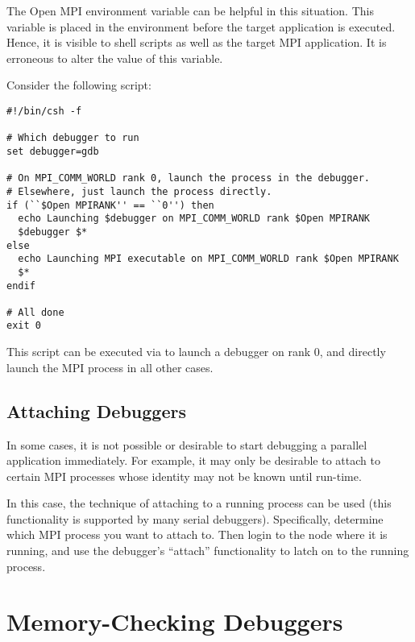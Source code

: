 The Open MPI environment variable  can be
helpful in this situation.  This variable is placed in the environment
before the target application is executed.  Hence, it is visible to
shell scripts as well as the target MPI application.  It is erroneous
to alter the value of this variable.

Consider the following script:

\lstset{style=lam-shell}
\begin{lstlisting}
#!/bin/csh -f

# Which debugger to run
set debugger=gdb

# On MPI_COMM_WORLD rank 0, launch the process in the debugger.
# Elsewhere, just launch the process directly.
if (``$Open MPIRANK'' == ``0'') then
  echo Launching $debugger on MPI_COMM_WORLD rank $Open MPIRANK
  $debugger $*
else
  echo Launching MPI executable on MPI_COMM_WORLD rank $Open MPIRANK
  $*
endif

# All done
exit 0
\end{lstlisting}

This script can be executed via  to launch a debugger on
 rank 0, and directly launch the MPI
process in all other cases.


\subsection{Attaching Debuggers}

In some cases, it is not possible or desirable to start debugging a
parallel application immediately.  For example, it may only be
desirable to attach to certain MPI processes whose identity may not be
known until run-time.

In this case, the technique of attaching to a running process can be
used (this functionality is supported by many serial debuggers).
Specifically, determine which MPI process you want to attach to.  Then
login to the node where it is running, and use the debugger's
``attach'' functionality to latch on to the running process.


\section{Memory-Checking Debuggers}
\label{sec:debug-mem}

